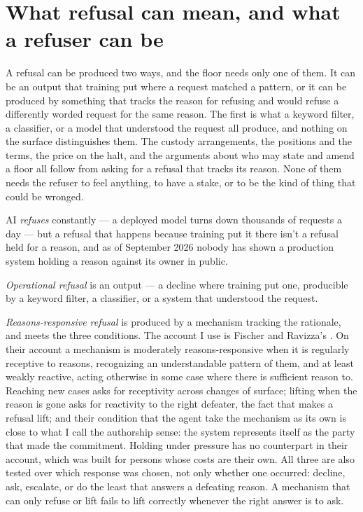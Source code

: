 \section{What refusal can mean, and what a refuser can be}
\label{sec:18.2}
A refusal can be produced two ways, and the floor needs only one of them. It can be an output that training put where a request matched a pattern, or it can be produced by something that tracks the reason for refusing and would refuse a differently worded request for the same reason. The first is what a keyword filter, a classifier, or a model that understood the request all produce, and nothing on the surface distinguishes them. The custody arrangements, the positions and the terms, the price on the halt, and the arguments about who may state and amend a floor all follow from asking for a refusal that tracks its reason. None of them needs the refuser to feel anything, to have a stake, or to be the kind of thing that could be wronged.

AI \emph{refuses} constantly — a deployed model turns down thousands of requests a day — but a refusal that happens because training put it there isn't a refusal held for a reason, and as of September 2026 nobody has shown a production system holding a reason against its owner in public.

\emph{Operational refusal} is an output — a decline where training put one, producible by a keyword filter, a classifier, or a system that understood the request.

\emph{Reasons-responsive refusal} is produced by a mechanism tracking the rationale, and meets the three conditions. The account I use is Fischer and Ravizza's \autocite{fischer1998responsibility}. On their account a mechanism is moderately reasons-responsive when it is regularly receptive to reasons, recognizing an understandable pattern of them, and at least weakly reactive, acting otherwise in some case where there is sufficient reason to. Reaching new cases asks for receptivity across changes of surface; lifting when the reason is gone asks for reactivity to the right defeater, the fact that makes a refusal lift; and their condition that the agent take the mechanism as its own is close to what I call the authorship sense: the system represents itself as the party that made the commitment. Holding under pressure has no counterpart in their account, which was built for persons whose costs are their own. All three are also tested over which response was chosen, not only whether one occurred: decline, ask, escalate, or do the least that answers a defeating reason. A mechanism that can only refuse or lift fails to lift correctly whenever the right answer is to ask.

